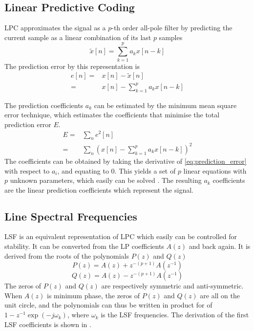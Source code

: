 \subsection{Linear Predictive Coding} %
\label{sub:lpc}
LPC approximates the signal as a $p$-th order all-pole filter by predicting the current sample as a linear combination of its last $p$ samples \cite{digsig}
\begin{equation}
	\tilde{x}[n] = \sum_{k=1}^{p}a_k x[n-k]
\end{equation}
The prediction error by this representation is 
\begin{equation}
	\begin{split}
		e[n]= & x[n]-\tilde{x}[n]\\
		= & x[n]-\sum_{k=1}^{p}a_k x[n-k]
	\end{split}
\end{equation}

The prediction coefficients $a_k$ can be estimated by the minimum mean square error technique, which estimates the coefficients that minimise the total prediction error $E$.
\begin{equation}
	\label{eq:prediction_error}
	\begin{split}
		E = & \sum_{n}e^2[n]\\
		= & \sum_{n}\left( x[n]-\sum_{k=1}^{p}a_k x[n-k] \right)^2
	\end{split}
\end{equation}
The coefficients can be obtained by taking the derivative of \eqref{eq:prediction_error} with respect to $a_i$, and equating to 0. This yields a set of $p$ linear equations with $p$ unknown parameters, which easily can be solved \cite{digsig}. The resulting $a_k$ coefficients are the linear prediction coefficients which represent the signal.

\subsection{Line Spectral Frequencies} %
\label{sub:line_spectral_frequencies}

LSF is an equivalent representation of LPC which easily can be controlled for stability. It can be converted from the LP coefficients $A(z)$ and back again. It is derived from the roots of the polynomials $P(z)$ and $Q(z)$ 
\begin{equation}
	\label{eq:p_z}
	P(z) = A(z)+z^{-(p+1)}A(z^{-1})
\end{equation}
\begin{equation}
	\label{eq:q_z}
	Q(z) = A(z)-z^{-(p+1)}A(z^{-1})
\end{equation}
The zeros of $P(z)$ and $Q(z)$ are respectively symmetric and anti-symmetric. When $A(z)$ is minimum phase, the zeros of $P(z)$ and $Q(z)$ are all on the unit circle, and the polynomials can thus be written in product for of
$1-z^{-1}\exp(-j\omega_k)$, where $\omega_k$ is the LSF frequencies. The derivation of the first LSF coefficients is shown in \cite[p. 304]{taletek}.

